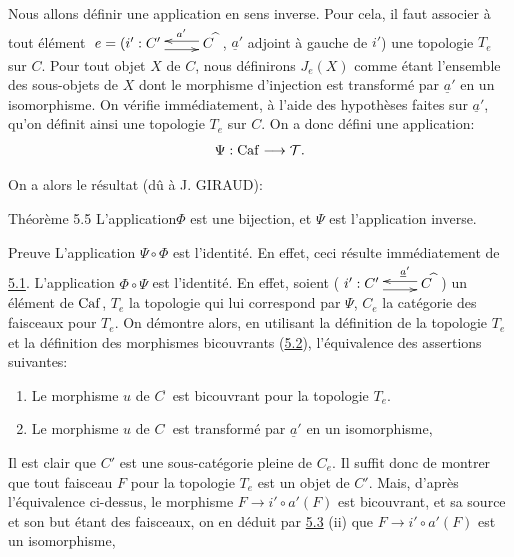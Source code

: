 \documentclass[10pt]{../fichiers-configuration-latex/smfart}
\begin{document}
Nous allons définir une application en sens inverse. Pour cela, il
faut associer à tout élément $\xymatrix{ e=(i': C' \ar@<-4pt>[r]&
\ar@<-2pt>[l]_(.35){a'} C^{\widehat{\phantom{,}}} }$, $\underline{a}'$
adjoint à gauche de $i'$) une topologie $T_e$ sur $C$. Pour tout
objet $X$ de $C$, nous définirons $J_e(X)$ comme étant
l'ensemble des sous-objets de $X$ dont le morphisme d'injection est
transformé par $\underline{a}'$ en un isomorphisme. On vérifie
immédiatement, à l'aide des hypothèses faites sur $\underline{a}'$,
qu'on définit ainsi une topologie $T_e$ sur $C$. On a donc
défini une application:
$$
\Psi:\operatorname{Caf}\longrightarrow {\mathcal T}{}.
$$

On a alors le résultat (d\^u à J. GIRAUD):

\begin{enonce*}{Théorème 5.5}
L'application\pageoriginale $\Phi$ est une bijection, et $\Psi$ est
l'application inverse.
\end{enonce*}

\begin{enonce*}[remark]{Preuve}
L'application $\Psi\circ \Phi$ est l'identité. En effet, ceci
résulte immédiatement de \hyperref[II.prop5.1]{5.1}. L'application
$\Phi\circ \Psi$ est l'identité. En effet, soient ($\xymatrix{ i':
C' \ar@<-4pt>[r]& \ar@<-2pt>[l]_(.35){{\underline{a}'}}
C^{\widehat{\phantom{,}}} }$) un élément de $\operatorname{Caf}$, $T_e$ la
topologie qui lui correspond par $\Psi$, $C_e$ la catégorie des
faisceaux pour $T_e$. On démontre alors, en utilisant la
définition de la topologie $T_e$ et la définition des morphismes
bicouvrants (\hyperref[II.def5.2]{5.2}), l'équivalence des assertions
suivantes:
\begin{enumerate}
\renewcommand{\theenumi}{\roman{enumi}}
\renewcommand{\labelenumi}{\theenumi)}
\item Le morphisme $u$ de $C^{\widehat{\phantom{,}}}$ est bicouvrant
  pour la topologie $T_e$.

\item Le morphisme $u$ de $C^{\widehat{\phantom{,}}}$ est transformé
  par $\underline{a}'$ en un isomorphisme,
\end{enumerate}

Il est clair que $C'$ est une sous-catégorie pleine de $C_e$. Il
suffit donc de montrer que tout faisceau $F$ pour la topologie $T_e$
est un objet de $C'$. Mais, d'après l'équivalence ci-dessus, le
morphisme $F\rightarrow i'\circ a'(F)$ est bicouvrant, et sa source
et son but étant des faisceaux, on en déduit par
\hyperref[II.prop5.3]{5.3} (ii) que $F\rightarrow i'\circ a'(F)$ est un
isomorphisme, \cqfd
\end{enonce*}
\end{document}

